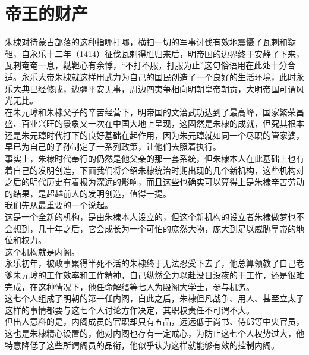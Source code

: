 \section{帝王的财产}
\ifnum{}
	\begin{multicols}{\theparacolNo}
\fi
朱棣对待蒙古部落的这种指哪打哪，横扫一切的军事讨伐有效地震慑了瓦剌和鞑靼，自永乐十二年（1414）征伐瓦剌得胜归来后，明帝国的边界终于安静了下来，瓦剌奄奄一息，鞑靼心有余悸，“不打不服，打服为止”这句俗语用在此处十分合适。永乐大帝朱棣就这样用武力为自己的国民创造了一个良好的生活环境，此时永乐大典已经修成，边疆平安无事，周边四夷争相向明朝皇帝朝贡，大明帝国可谓风光无比。\\

在朱元璋和朱棣父子的辛苦经营下，明帝国的文治武功达到了最高峰，国家繁荣昌盛、百业兴旺的景象又一次在中国大地上呈现，这固然是朱棣的成就，但究其根本还是朱元璋时代打下的良好基础在起作用，因为朱元璋就如同一个尽职的管家婆，早已为自己的子孙制定了一系列政策，让他们去照着执行。\\

事实上，朱棣时代奉行的仍然是他父亲的那一套系统，但朱棣本人在此基础上也有着自己的发明创造，下面我们将介绍朱棣统治时期出现的几个新机构，这些机构对之后的明代历史有着极为深远的影响，而且这些也确实可以算得上是朱棣辛苦劳动的结果，是超越前人的发明创造，值得一提。\\

我们先从最重要的一个说起。\\

这是一个全新的机构，是由朱棣本人设立的，但这个新机构的设立者朱棣做梦也不会想到，几十年之后，它会成长为一个可怕的庞然大物，庞大到足以威胁皇帝的地位和权力。\\

这个机构就是内阁。\\

永乐初年，被政事累得半死不活的朱棣终于无法忍受下去了，他总算领教了自己老爹朱元璋的工作效率和工作精神，自己纵然全力以赴没日没夜的干工作，还是很难完成，在这种情况下，他任命解缙等七人为殿阁大学士，参与机务。\\

这七个人组成了明朝的第一任内阁，自此之后，朱棣但凡战争、用人、甚至立太子这样的事情都要与这七个人讨论方作决定，其职权责任不可谓不大。\\

但出人意料的是，内阁成员的官职却只有五品，远远低于尚书、侍郎等中央官员，这也是朱棣精心设置的，他对内阁也存有一定戒心，为防止这七个人权势过大，他特意降低了这些所谓阁员的品衔，他似乎认为这样就能够有效的控制内阁。\\


\end{multicols}

